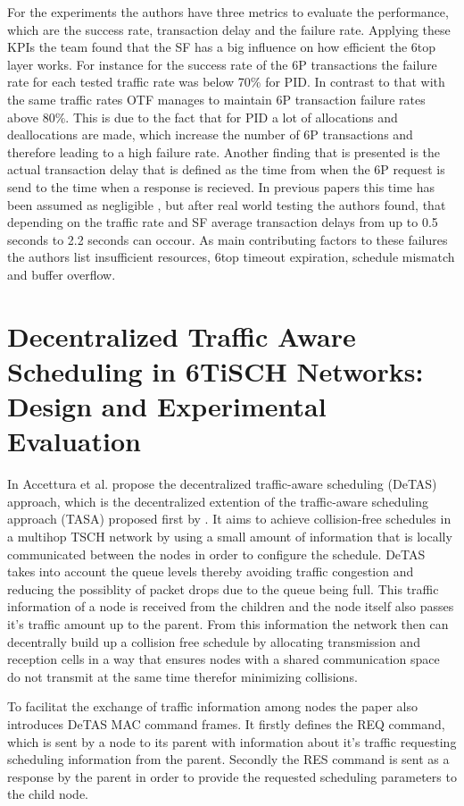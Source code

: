 \documentclass{comnets-thesis}
\begin{document}
For the experiments the authors have three metrics to evaluate the performance, which are the success rate, transaction delay and the failure rate. Applying these KPIs the team found that the SF has a big influence on how efficient the 6top layer works. For instance for the success rate of the 6P transactions the failure rate for each tested traffic rate was below 70\% for PID. In contrast to that with the same traffic rates OTF manages to maintain 6P transaction failure rates above 80\%. This is due to the fact that for PID a lot of allocations and deallocations are made, which increase the number of 6P transactions and therefore leading to a high failure rate.
Another finding that is presented is the actual transaction delay that is defined as the time from when the 6P request is send to the time when a response is recieved. In previous papers this time has been assumed as negligible \cite{DecentralizedBroadcastBasedScheduling}, but after real world testing the authors found, that depending on the traffic rate and SF average transaction delays from up to 0.5 seconds to 2.2 seconds can occour.
As main contributing factors to these failures the authors list insufficient resources, 6top timeout expiration, schedule mismatch and buffer overflow.


\section{Decentralized Traffic Aware Scheduling in 6TiSCH Networks: Design and Experimental Evaluation}
In \cite{7254107} Accettura et al. propose the decentralized traffic-aware scheduling (DeTAS) approach, which is the decentralized extention of the traffic-aware scheduling approach (TASA) proposed first by \cite{Palattella2012}. It aims to achieve collision-free schedules in a multihop \ac{TSCH} network by using a small amount of information that is locally communicated between the nodes in order to configure the schedule. DeTAS takes into account the queue levels thereby avoiding traffic congestion and reducing the possiblity of packet drops due to the queue being full. This traffic information of a node is received from the children and the node itself also passes it's traffic amount up to the parent. From this information the network then can decentrally build up a collision free schedule by allocating transmission and reception cells in a way that ensures nodes with a shared communication space do not transmit at the same time therefor minimizing collisions.

To facilitat the exchange of traffic information among nodes the paper also introduces DeTAS \ac{MAC} command frames. It firstly defines the REQ command, which is sent by a node to its parent with information about it's traffic requesting scheduling information from the parent. Secondly the RES command is sent as a response by the parent in order to provide the requested scheduling parameters to the child node.
\end{document}
